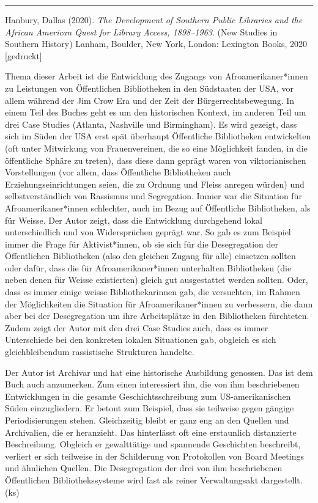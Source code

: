 \documentclass[a4paper,
fontsize=11pt,
oneside,
numbers=noperiodatend,
parskip=half-,
bibliography=totoc,
final
]{scrartcl}
\begin{document}
\begin{center}\rule{0.5\linewidth}{0.5pt}\end{center}

Hanbury, Dallas (2020). \emph{The Development of Southern Public
Libraries and the African American Quest for Library Access,
1898--1963}. (New Studies in Southern History) Lanham, Boulder, New
York, London: Lexington Books, 2020 {[}gedruckt{]}

Thema dieser Arbeit ist die Entwicklung des Zugangs von
Afroamerikaner*innen zu Leistungen von Öffentlichen Bibliotheken in den
Südstaaten der USA, vor allem während der Jim Crow Era und der Zeit der
Bürgerrechtsbewegung. In einem Teil des Buches geht es um den
historischen Kontext, im anderen Teil um drei Case Studies (Atlanta,
Nashville und Birmingham). Es wird gezeigt, dass sich im Süden der USA
erst spät überhaupt Öffentliche Bibliotheken entwickelten (oft unter
Mitwirkung von Frauenvereinen, die so eine Möglichkeit fanden, in die
öffentliche Sphäre zu treten), dass diese dann geprägt waren von
viktorianischen Vorstellungen (vor allem, dass Öffentliche Bibliotheken
auch Erziehungseinrichtungen seien, die zu Ordnung und Fleiss anregen
würden) und selbstverständlich von Rassismus und Segregation. Immer war
die Situation für Afroamerikaner*innen schlechter, auch im Bezug auf
Öffentliche Bibliotheken, als für Weisse. Der Autor zeigt, dass die
Entwicklung durchgehend lokal unterschiedlich und von Widersprüchen
geprägt war. So gab es zum Beispiel immer die Frage für Aktivist*innen,
ob sie sich für die Desegregation der Öffentlichen Bibliotheken (also
den gleichen Zugang für alle) einsetzen sollten oder dafür, dass die für
Afroamerikaner*innen unterhalten Bibliotheken (die neben denen für
Weisse existierten) gleich gut ausgestattet werden sollten. Oder, dass
es immer einige weisse Bibliothekarinnen gab, die versuchten, im Rahmen
der Möglichkeiten die Situation für Afroamerikaner*innen zu verbessern,
die dann aber bei der Desegregation um ihre Arbeitsplätze in den
Bibliotheken fürchteten. Zudem zeigt der Autor mit den drei Case Studies
auch, dass es immer Unterschiede bei den konkreten lokalen Situationen
gab, obgleich es sich gleichbleibendum rassistische Strukturen handelte.

Der Autor ist Archivar und hat eine historische Ausbildung genossen. Das
ist dem Buch auch anzumerken. Zum einen interessiert ihn, die von ihm
beschriebenen Entwicklungen in die gesamte Geschichtsschreibung zum
US-amerikanischen Süden einzugliedern. Er betont zum Beispiel, dass sie
teilweise gegen gängige Periodisierungen stehen. Gleichzeitig bleibt er
ganz eng an den Quellen und Archivalien, die er heranzieht. Das
hinterlässt oft eine erstaunlich distanzierte Beschreibung. Obgleich er
gewalttätige und spannende Geschichten beschreibt, verliert er sich
teilweise in der Schilderung von Protokollen von Board Meetings und
ähnlichen Quellen. Die Desegregation der drei von ihm beschriebenen
Öffentlichen Bibliothekssysteme wird fast als reiner Verwaltungsakt
dargestellt. (ks)
\end{document}
